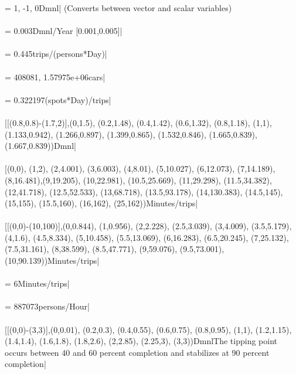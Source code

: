  = 1, -1, 0Dmnl| (Converts between vector and scalar variables) \\ \\ 
 = 0.003Dmnl/Year [0.001,0.005]| \\ \\ 
 = 0.445trips/(persons*Day)| \\ \\ 
 = 408081, 1.57975e+06cars| \\ \\ 
 = 0.322197(spots*Day)/trips| \\ \\ 
 [[(0.8,0.8)-(1.7,2)],(0,1.5), (0.2,1.48), (0.4,1.42), (0.6,1.32), (0.8,1.18), (1,1), (1.133,0.942), (1.266,0.897), (1.399,0.865), (1.532,0.846), (1.665,0.839), (1.667,0.839))Dmnl| \\ \\ 
 [(0,0), (1,2), (2,4.001), (3,6.003), (4,8.01), (5,10.027), (6,12.073), (7,14.189), (8,16.481),(9,19.205), (10,22.981), (10.5,25.669), (11,29.298), (11.5,34.382), (12,41.718), (12.5,52.533), (13,68.718), (13.5,93.178), (14,130.383), (14.5,145), (15,155), (15.5,160), (16,162), (25,162))Minutes/trips| \\ \\ 
 [[(0,0)-(10,100)],(0,0.844), (1,0.956), (2,2.228), (2.5,3.039), (3,4.009), (3.5,5.179), (4,1.6), (4.5,8.334), (5,10.458), (5.5,13.069), (6,16.283), (6.5,20.245), (7,25.132), (7.5,31.161), (8,38.599), (8.5,47.771), (9,59.076), (9.5,73.001), (10,90.139))Minutes/trips| \\ \\ 
 = 6Minutes/trips| \\ \\ 
 = 887073persons/Hour| \\ \\ 
 [[(0,0)-(3,3)],(0,0.01), (0.2,0.3), (0.4,0.55), (0.6,0.75), (0.8,0.95), (1,1), (1.2,1.15), (1.4,1.4), (1.6,1.8), (1.8,2.6), (2,2.85), (2.25,3), (3,3))DmnlThe tipping point occurs between 40 and 60 percent completion and stabilizes at 90 percent completion| \\ \\ 

